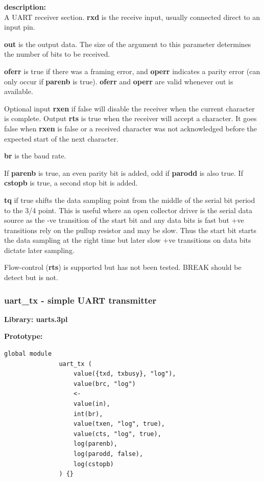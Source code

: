             {\bf description:} \\
            A UART receiver section. {\bf rxd} is the receive input, usually
            connected direct to an input pin.

            {\bf out} is the output data. The size of the argument to
            this parameter determines the number of bits to be received.

            {\bf oferr} is true if there was a framing error, and {\bf operr}
            indicates a parity error (can only occur if {\bf parenb} is true).
            {\bf oferr} and {\bf operr} are valid whenever out is available.

            Optional input {\bf rxen} if false will disable the receiver when
            the current character is complete. Output {\bf rts} is true when
            the receiver will accept a character. It goes false when {\bf rxen}
            is false or a received character was not acknowledged before the
            expected start of the next character.

            {\bf br} is the baud rate.
            
            If {\bf parenb} is true, an even parity bit is added, odd if {\bf
            parodd} is also true. If {\bf cstopb} is true, a second stop bit is
            added.
            
            {\bf tq} if true shifts the data sampling point from the
            middle of the serial bit period to the 3/4 point. This is
            useful where an open collector driver is the serial data source
            as the -ve transition of the start bit and any data bits is fast
            but +ve transitions rely on the pullup resistor and may be slow.
            Thus the start bit starts the data sampling at the right time
            but later slow +ve transitions on data bits dictate later sampling.

            Flow-control ({\bf rts}) is supported but has not been tested.
            BREAK should be detect but is not.





        \subsubsection{uart\_tx - simple UART transmitter}\label{sec:lmsuarttx}

            {\bf Library: uarts.3pl}

            {\bf Prototype:} \\
            \vsp
            \begin{lstlisting}[gobble=12, language=threepl]
               global module
               uart_tx (
                   value({txd, txbusy}, "log"),
                   value(brc, "log")
                   <-
                   value(in),
                   int(br),
                   value(txen, "log", true),
                   value(cts, "log", true),
                   log(parenb),
                   log(parodd, false),
                   log(cstopb)
               ) {}
            \end{lstlisting}

